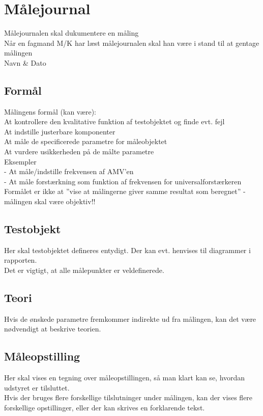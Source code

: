 


\chapter{Målejournal}
\label{maalejournal}
Målejournalen skal dukumentere en måling\\
Når en fagmand M/K har læst målejournalen skal han være i stand til at gentage målingen\\
Navn \& Dato

\section{Formål}
\label{maalejournal_formaal}
Målingens formål (kan være):\\
At kontrollere den kvalitative funktion af testobjektet og finde evt. fejl\\
At indstille justerbare komponenter \\
At måle de specificerede parametre for måleobjektet \\
At vurdere usikkerheden på de målte parametre\\
Eksempler \\
- At måle/indstille frekvensen af AMV’en\\
- At måle forstærkning som funktion af frekvensen for universalforstærkeren\\
Formålet er ikke at ”vise at målingerne giver samme resultat som beregnet” - målingen skal være objektiv!!\\

\section{Testobjekt}
\label{maalejournal_testobjekt}
Her skal testobjektet defineres entydigt. Der kan evt. henvises til diagrammer i rapporten.\\
Det er vigtigt, at alle målepunkter er veldefinerede.\\

\section{Teori}
\label{maalejournal_teori}
Hvis de ønskede parametre fremkommer indirekte ud fra målingen, kan det være nødvendigt at beskrive teorien.\\

\section{Måleopstilling}
\label{maalejournal_maaleopstilling}
Her skal vises en tegning over måleopstillingen, så man klart kan se, hvordan udstyret er tilsluttet.\\
Hvis der bruges flere forskellige tilslutninger under målingen, kan der vises flere forskellige opstillinger, eller der kan skrives en forklarende tekst.\\

